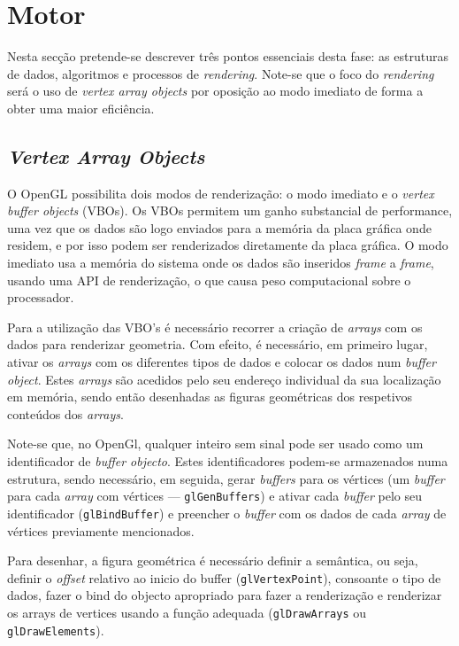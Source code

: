 \section{Motor}

Nesta secção pretende-se descrever três pontos essenciais desta fase: as
estruturas de dados, algoritmos e processos de \emph{rendering}. Note-se que
o foco do \emph{rendering} será o uso de \emph{vertex array objects} por
oposição ao modo imediato de forma a obter uma maior eficiência.  


\subsection{\emph{Vertex Array Objects}}

O OpenGL possibilita dois modos de renderização: o modo imediato
e o \emph{vertex buffer objects} (VBOs). Os VBOs permitem um ganho substancial
de performance, uma vez que os dados são logo enviados para a memória da placa
gráfica onde residem, e por isso podem ser renderizados diretamente da placa
gráfica. O modo imediato usa a memória do sistema onde os dados são inseridos
\emph{frame} a \emph{frame}, usando uma API de renderização, o que causa peso
computacional sobre o processador.

Para a utilização das VBO's é necessário recorrer a criação de \emph{arrays} com os
dados para renderizar geometria. Com efeito, é necessário, em primeiro lugar,
ativar os \emph{arrays} com os diferentes tipos de dados e colocar os dados num
\emph{buffer object}. Estes \emph{arrays} são acedidos pelo seu endereço individual da
sua localização em memória, sendo então desenhadas as figuras geométricas dos
respetivos conteúdos dos \emph{arrays}.

Note-se que, no OpenGl, qualquer inteiro sem sinal pode ser usado como um
identificador de \emph{buffer objecto}. Estes identificadores podem-se
armazenados numa estrutura, sendo necessário, em seguida, gerar \emph{buffers} para os
vértices (um \emph{buffer} para cada \emph{array} com vértices ---
\texttt{glGenBuffers}) e ativar cada \emph{buffer} pelo seu identificador
(\texttt{glBindBuffer}) e preencher o \emph{buffer} com os dados de cada
\emph{array} de vértices previamente mencionados.

Para desenhar, a figura geométrica é necessário definir a semântica, ou seja,
definir o \emph{offset} relativo ao inicio do buffer (\texttt{glVertexPoint}),
consoante o tipo de dados, fazer o bind do objecto apropriado para fazer
a renderização e renderizar os arrays de vertices usando a função adequada
(\texttt{glDrawArrays} ou \texttt{glDrawElements}).

